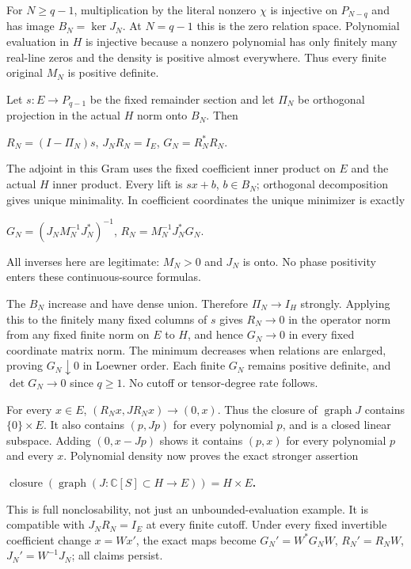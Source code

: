 For \(N\ge q-1\), multiplication by the literal nonzero \(\chi\) is injective on \(P_{N-q}\) and has image \(B_N=\ker J_N\). At \(N=q-1\) this is the zero relation space. Polynomial evaluation in \(H\) is injective because a nonzero polynomial has only finitely many real-line zeros and the density is positive almost everywhere. Thus every finite original \(M_N\) is positive definite.

Let \(s:E\longrightarrow P_{q-1}\) be the fixed remainder section and let \(\Pi_N\) be orthogonal projection in the actual \(H\) norm onto \(B_N\). Then

\(R_N=(I-\Pi_N)s\), \(J_NR_N=I_E\), \(G_N=R_N^*R_N\).

The adjoint in this Gram uses the fixed coefficient inner product on \(E\) and the actual \(H\) inner product. Every lift is \(sx+b\), \(b\in B_N\); orthogonal decomposition gives unique minimality. In coefficient coordinates the unique minimizer is exactly

\(G_N=(J_NM_N^{-1}J_N^*)^{-1}\), \(R_N=M_N^{-1}J_N^*G_N\).

All inverses here are legitimate: \(M_N>0\) and \(J_N\) is onto. No phase positivity enters these continuous-source formulas.

The \(B_N\) increase and have dense union. Therefore \(\Pi_N\longrightarrow I_H\) strongly. Applying this to the finitely many fixed columns of \(s\) gives \(R_N\longrightarrow0\) in the operator norm from any fixed finite norm on \(E\) to \(H\), and hence \(G_N\longrightarrow0\) in every fixed coordinate matrix norm. The minimum decreases when relations are enlarged, proving \(G_N\downarrow0\) in Loewner order. Each finite \(G_N\) remains positive definite, and \(\det G_N\longrightarrow0\) since \(q\ge1\). No cutoff or tensor-degree rate follows.

For every \(x\in E\), \((R_Nx,JR_Nx)\longrightarrow(0,x)\). Thus the closure of \(\operatorname{graph}J\) contains \(\{0\}\times E\). It also contains \((p,Jp)\) for every polynomial \(p\), and is a closed linear subspace. Adding \((0,x-Jp)\) shows it contains \((p,x)\) for every polynomial \(p\) and every \(x\). Polynomial density now proves the exact stronger assertion

\textbf{\(\operatorname{closure}(\operatorname{graph}(J:\mathbb C[S]\subset H\longrightarrow E))=H\times E\).}

This is full nonclosability, not just an unbounded-evaluation example. It is compatible with \(J_NR_N=I_E\) at every finite cutoff. Under every fixed invertible coefficient change \(x=Wx'\), the exact maps become \(G_N'=W^*G_NW\), \(R_N'=R_NW\), \(J_N'=W^{-1}J_N\); all claims persist.

